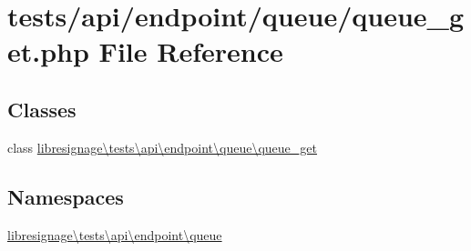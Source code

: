 \hypertarget{tests_2api_2endpoint_2queue_2queue__get_8php}{}\section{tests/api/endpoint/queue/queue\+\_\+get.php File Reference}
\label{tests_2api_2endpoint_2queue_2queue__get_8php}
\subsection*{Classes}
\begin{DoxyCompactItemize}
\item 
class \hyperlink{classlibresignage_1_1tests_1_1api_1_1endpoint_1_1queue_1_1queue__get}{libresignage\textbackslash{}tests\textbackslash{}api\textbackslash{}endpoint\textbackslash{}queue\textbackslash{}queue\+\_\+get}
\end{DoxyCompactItemize}
\subsection*{Namespaces}
\begin{DoxyCompactItemize}
\item 
 \hyperlink{namespacelibresignage_1_1tests_1_1api_1_1endpoint_1_1queue}{libresignage\textbackslash{}tests\textbackslash{}api\textbackslash{}endpoint\textbackslash{}queue}
\end{DoxyCompactItemize}
